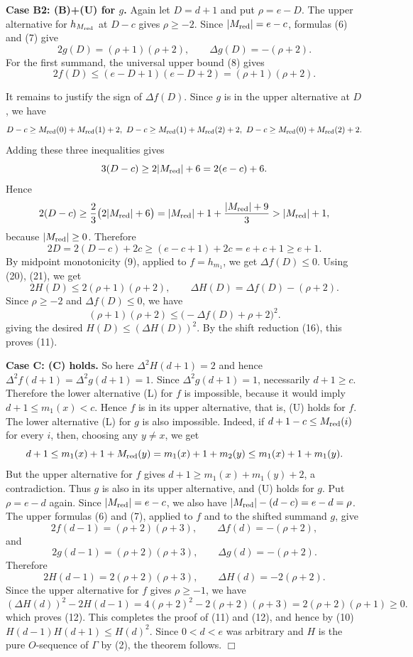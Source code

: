 \medskip
\noindent\textbf{Case B2: (B)+(U) for $g$.}
Again let $D=d+1$ and put $\rho=e-D$.  The upper alternative for
$h_{M_{\rm red}}$ at $D-c$ gives $\rho\ge -2$.  Since
$|M_{\rm red}|=e-c$, formulas (6) and (7) give
\[
  2g(D)=(\rho+1)(\rho+2),
  \qquad
  \Delta g(D)=-(\rho+2).                                  \tag{20}
\]
For the first summand, the universal upper bound (8) gives
\[
  2f(D)\le(e-D+1)(e-D+2)=(\rho+1)(\rho+2).                 \tag{21}
\]

It remains to justify the sign of $\Delta f(D)$.  Since $g$ is in the
upper alternative at $D$, we have
\[
  D-c\ge M_{\rm red}(0)+M_{\rm red}(1)+2,\ 
  D-c\ge M_{\rm red}(1)+M_{\rm red}(2)+2,\ D-c\ge M_{\rm red}(0)+M_{\rm red}(2)+2.
\]
Adding these three inequalities gives
\[
  3(D-c)\ge 2|M_{\rm red}|+6=2(e-c)+6.
\]
Hence 
\[
  2(D-c)
  \ge
  \frac{2}{3}\bigl(2|M_{\rm red}|+6\bigr)
  =
  |M_{\rm red}|+1+\frac{|M_{\rm red}|+9}{3}
  >
  |M_{\rm red}|+1,
\]
because $|M_{\rm red}|\ge0$.
Therefore
\[
  2D=2(D-c)+2c\ge (e-c+1)+2c=e+c+1\ge e+1.
\]
By midpoint monotonicity (9), applied to $f=h_{m_1}$, we get $\Delta f(D)\le0$. Using (20), (21), we get 
\[
  2H(D)\le2(\rho+1)(\rho+2),
  \qquad
  \Delta H(D)=\Delta f(D)-(\rho+2).
\]
Since $\rho\ge-2$ and $\Delta f(D)\le0$, we have
\[
  (\rho+1)(\rho+2)\le\bigl(-\Delta f(D)+\rho+2\bigr)^2.
\]
giving the desired $H(D)\le(\Delta H(D))^2$. By the shift reduction (16), this proves (11).

\medskip
\noindent\textbf{Case C: (C) holds.}
So here $\Delta^2H(d+1)=2$ and hence $\Delta^2f(d+1)=\Delta^2g(d+1)=1$.
Since $\Delta^2g(d+1)=1$, necessarily $d+1\ge c$.
Therefore the lower alternative (L) for $f$ is impossible, because it
would imply $d+1\le m_1(x)<c$.
Hence $f$ is in its upper alternative, that is, (U) holds for $f$. The lower alternative (L) for $g$ is also impossible. Indeed, if $d+1-c\le M_{\rm red}(i)$ for every $i$,
then, choosing any $y\ne x$, we get
\[
  d+1
  \le
  m_1(x)+1+M_{\rm red}(y)
  =
  m_1(x)+1+m_2(y)
  \le
  m_1(x)+1+m_1(y).
\]
But the upper alternative for $f$ gives $d+1\ge m_1(x)+m_1(y)+2$, a contradiction.  Thus $g$ is also in its upper alternative, and (U) holds for $g$.
Put $\rho=e-d$ again. Since $|M_{\rm red}|=e-c$, we also have $|M_{\rm red}|-(d-c)=e-d=\rho$.
The upper formulas (6) and (7), applied to $f$ and to the shifted
summand $g$, give
\[
  2f(d-1)=(\rho+2)(\rho+3),
  \qquad
  \Delta f(d)=-(\rho+2),
\]
and
\[
  2g(d-1)=(\rho+2)(\rho+3),
  \qquad
  \Delta g(d)=-(\rho+2).
\]
Therefore
\[
  2H(d-1)=2(\rho+2)(\rho+3),
  \qquad
  \Delta H(d)=-2(\rho+2).
\]
Since the upper alternative for $f$ gives $\rho\ge-1$, we have
\[
  (\Delta H(d))^2-2H(d-1)
  =
  4(\rho+2)^2-2(\rho+2)(\rho+3)
  =
  2(\rho+2)(\rho+1)
  \ge0.
\]
which proves (12). This completes the proof of (11) and (12), and hence by (10) $H(d-1)H(d+1)\le H(d)^2$.
Since $0<d<e$ was arbitrary and $H$ is the pure $O$-sequence of
$\Gamma$ by (2), the theorem follows. \hfill $\Box$

